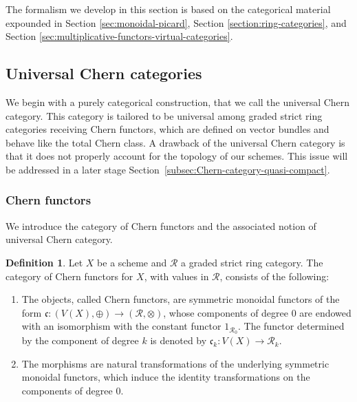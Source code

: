 \documentclass[JEP,XML,SOM,Unicode,published]{cedram}
\theoremstyle{plain}
\theoremstyle{definition}
\newtheorem{definition}[theorem]{Definition}
\newcommand{\Rcal}{\mathcal R}
\newcommand{\cfrak}{\mathfrak c}
\begin{document}
The formalism we develop in this section is based on the categorical material expounded in Section \ref{sec:monoidal-picard}, Section \ref{section:ring-categories}, and Section \ref{sec:multiplicative-functors-virtual-categories}.

\subsection{Universal Chern categories}\label{subsec:universal-chern-categories}
We begin with a purely categorical construction, that we call the universal Chern category. This category is tailored to be universal among graded strict ring categories receiving Chern functors, which are defined on vector bundles and behave like the total Chern class. A drawback of the universal Chern category is that it does not properly account for the topology of our schemes. This issue will be addressed in a later stage Section~\ref{subsec:Chern-category-quasi-compact}.

\subsubsection{Chern functors}
We introduce the category of Chern functors and the associated notion of universal Chern category.
\begin{definition}\label{def:axiom-chern-functor}
Let $X$ be a scheme and $\Rcal$ a graded strict ring category. The category of Chern functors for $X$, with values in $\Rcal$, consists of the following:
\begin{enumerate}
\item The objects, called Chern functors, are symmetric monoidal functors of the form $\cfrak: (V(X),\oplus) \to (\Rcal,\otimes)$, whose components of degree $0$ are endowed with an isomorphism with the constant functor $1_{\Rcal_{0}}$. The functor determined by the component of degree $k$ is denoted by $\cfrak_k : V(X) \to \Rcal_k$.
\item The morphisms are natural transformations of the underlying symmetric monoidal functors, which induce the identity transformations on the components of degree 0.
\end{enumerate}
\end{definition}
\end{document}
